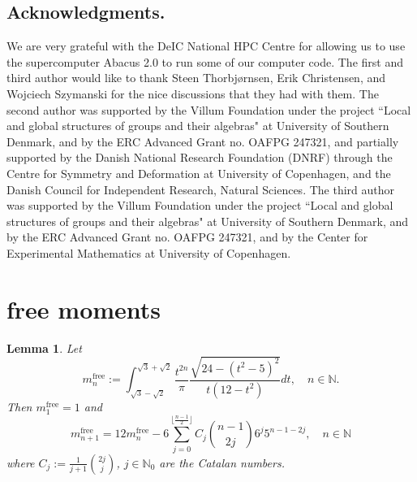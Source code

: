 \documentclass{amsart}
\newcommand{\N}{\mathbb N}
\newtheorem{lem}[thm]{Lemma}
\theoremstyle{definition}
\begin{document}
\subsection*{Acknowledgments.}
We are very grateful with the DeIC National HPC Centre for allowing us to use the supercomputer Abacus 2.0 to run some of our computer code.
The first and third author would like to thank  Steen Thorbj\o rnsen, Erik Christensen, and Wojciech Szymanski for the nice discussions that they had with them.
The second author was supported by the Villum Foundation under the project ``Local and global structures of groups and their algebras" at University of Southern Denmark, and by the ERC Advanced Grant no. OAFPG 247321, and partially supported by the Danish National Research Foundation (DNRF) through the Centre for Symmetry and Deformation at University of Copenhagen, and the Danish Council for Independent Research, Natural Sciences.
 The third author was supported by the Villum Foundation under the project ``Local and global structures of groups and their algebras" at University of Southern Denmark, and by the ERC Advanced Grant no. OAFPG 247321, and by the Center for Experimental Mathematics at University of Copenhagen.


\appendix


\section{\textbf{free moments}}
\begin{lem}\label{l:mn_free}
Let
\begin{equation}\label{e:intfree} 
m_n^{\mathrm{free}}:=\int_{\sqrt{3}-\sqrt{2}}^{\sqrt{3}+\sqrt{2}} \frac{t^{2n}}{\pi}\frac{\sqrt{24-(t^2-5)^2}}{t(12-t^2)}dt,\quad n\in\N.
\end{equation}
Then $m_1^{\mathrm{free}}=1$ and 
$$m_{n+1}^{\mathrm{free}}=12m_n^{\mathrm{free}}-6\sum_{j=0}^{\lfloor {\frac{n-1}2} \rfloor} C_j\binom{n-1}{2j}6^j 5^{n-1-2j},\quad n\in\N$$
where $C_j:=\frac{1}{j+1}\binom{2j}j$, $j\in\N_0$ are the Catalan numbers.
\end{lem}
\end{document}
